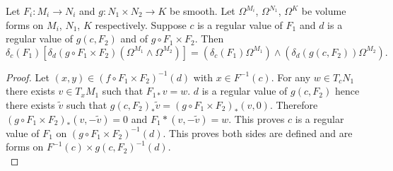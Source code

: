 \begin{proposition}\label{delta_product}
Let $F_i:M_i\rightarrow N_i$ and $g:N_1\times N_2\rightarrow K$ be smooth.  Let $\Omega^{M_i}$, $\Omega^{N_1}$, $\Omega^K$ be volume forms on $M_i$, $N_1$, $K$ respectively.  Suppose $c$ is a regular value of $F_1$ and $d$ is a regular value of $g(c,F_2)$ and of $g\circ F_1\times F_2$. Then 
\begin{equation}
\delta_c(F_1)\left[\delta_d( g\circ F_1\times F_2)\left(\Omega^{M_1}\wedge\Omega^{M_2}\right)\right]=\left(\delta_c(F_1)\Omega^{M_1}\right)\wedge\left(\delta_d(g(c, F_2))\Omega^{M_2}\right).
\end{equation}
\end{proposition}
\begin{proof}
 Let $(x,y)\in (f\circ F_1\times F_2)^{-1}(d)$ with $x\in F^{-1}(c)$. For any $w\in T_c N_1$ there exists $v\in T_x M_1$ such that $F_{1*}v=w$.  $d$ is a regular value of $g(c,F_2)$ hence there exists $\tilde{v}$ such that $g(c,F_2)_*\tilde{v}=(g\circ F_1\times F_2)_*(v,0)$.  Therefore $(g\circ F_1\times F_2)_*(v,-\tilde{v})=0$ and $F_1*(v,-\tilde{v})=w$.  This proves $c$ is a regular value of $F_1$ on $(g\circ F_1\times F_2)^{-1}(d)$.  This proves both sides are defined and are forms on $F^{-1}(c)\times g(c,F_2)^{-1}(d)$.\\


\end{proof}
